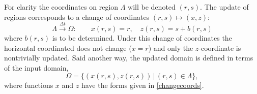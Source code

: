 \documentclass[letterpaper,final,12pt,reqno]{amsart}
\begin{document}
For clarity the coordinates on region $\Lambda$ will be denoted $(r,s)$.  The update of regions corresponds to a change of coordinates $(r,s) \mapsto (x,z)$:
\begin{equation}
\Lambda \stackrel{\Delta t}{\to} \Omega: \qquad x(r,s)=r, \quad z(r,s)=s+b(r,s) \label{changecoords}
\end{equation}
where $b(r,s)$ is to be determined.  Under this change of coordinates the horizontal coordinated does not change ($x=r$) and only the $z$-coordinate is nontrivially updated.  Said another way, the updated domain is defined in terms of the input domain,
\begin{equation}
\Omega = \{(x(r,s),z(r,s)) \,\big|\, (r,s) \in \Lambda\},  \label{updateddomain}
\end{equation}
where functions $x$ and $z$ have the forms given in \eqref{changecoords}.
\end{document}
